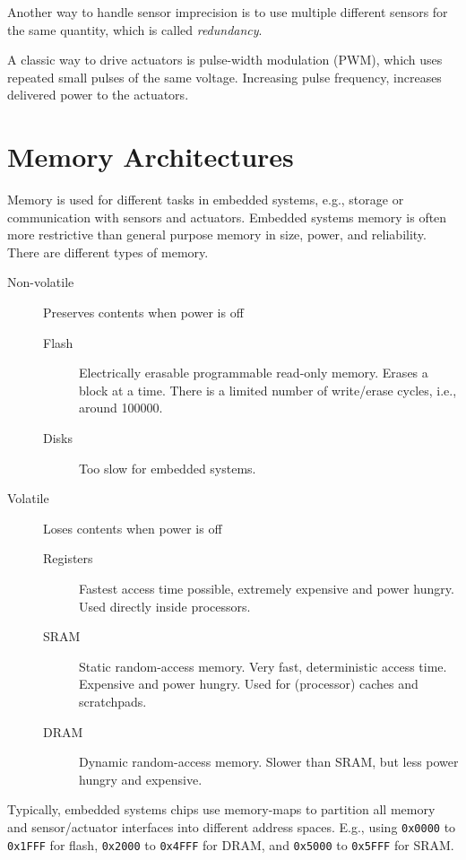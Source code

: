 Another way to handle sensor imprecision is to use multiple different sensors for the same quantity, which is called \emph{redundancy}.

A classic way to drive actuators is pulse-width modulation (PWM), which uses repeated small pulses of the same voltage.
Increasing pulse frequency, increases delivered power to the actuators.

\section{Memory Architectures}
Memory is used for different tasks in embedded systems, e.g., storage or communication with sensors and actuators.
Embedded systems memory is often more restrictive than general purpose memory in size, power, and reliability.
There are different types of memory.
\begin{description}
    \item[Non-volatile] Preserves contents when power is off \hfill
        \begin{description}
            \item[Flash] Electrically erasable programmable read-only memory.
                Erases a block at a time.
                There is a limited number of write/erase cycles, i.e., around 100000.

            \item[Disks] Too slow for embedded systems.
        \end{description}
    \item[Volatile] Loses contents when power is off \hfill
        \begin{description}
            \item[Registers] Fastest access time possible, extremely expensive and power hungry.
                Used directly inside processors.

            \item[SRAM] Static random-access memory.
                Very fast, deterministic access time.
                Expensive and power hungry.
                Used for (processor) caches and scratchpads.

            \item[DRAM] Dynamic random-access memory.
                Slower than SRAM, but less power hungry and expensive.
        \end{description}
\end{description}

Typically, embedded systems chips use memory-maps to partition all memory and sensor/actuator interfaces into different address spaces.
E.g., using \lstinline|0x0000| to \lstinline|0x1FFF| for flash, \lstinline|0x2000| to \lstinline|0x4FFF| for DRAM, and \lstinline|0x5000| to \lstinline|0x5FFF| for SRAM.

